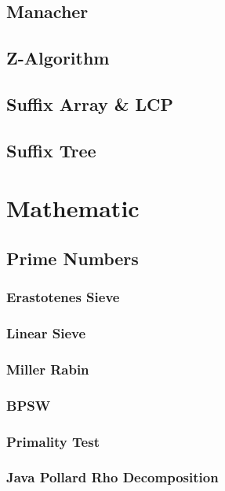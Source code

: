 \documentclass[10pt,a4paper]{report}
\begin{document}
	\section{Manacher}
	\section{Z-Algorithm}
	\newpage
	\section{Suffix Array \& LCP}
		
	\section{Suffix Tree}
	
\chapter{Mathematic}
	\section{Prime Numbers}
		\subsection{Erastotenes Sieve}
		\newpage
		\subsection{Linear Sieve}
			
		\newpage
		\subsection{Miller Rabin}
			
		\newpage
		\subsection{BPSW}
			
		\newpage
		\subsection{Primality Test}
			
		\newpage
		\subsection{Java Pollard Rho Decomposition}
			
		
\end{document}
